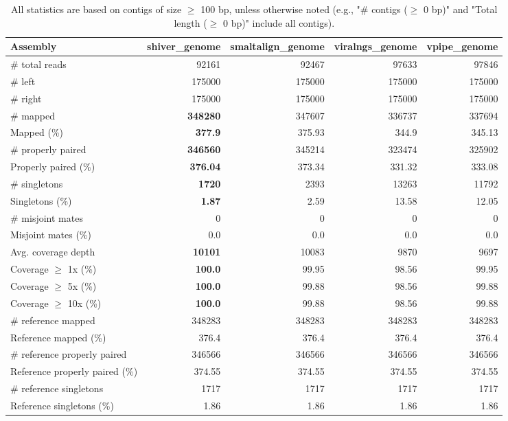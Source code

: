 \documentclass[12pt,a4paper]{article}
\begin{document}
\begin{table}[ht]
\begin{center}
\caption{All statistics are based on contigs of size $\geq$ 100 bp, unless otherwise noted (e.g., "\# contigs ($\geq$ 0 bp)" and "Total length ($\geq$ 0 bp)" include all contigs).}
\begin{tabular}{|l*{4}{|r}|}
\hline
Assembly & shiver\_genome & smaltalign\_genome & viralngs\_genome & vpipe\_genome \\ \hline
\# total reads & 92161 & 92467 & 97633 & 97846 \\ \hline
\# left & 175000 & 175000 & 175000 & 175000 \\ \hline
\# right & 175000 & 175000 & 175000 & 175000 \\ \hline
\# mapped & {\bf 348280} & 347607 & 336737 & 337694 \\ \hline
Mapped (\%) & {\bf 377.9} & 375.93 & 344.9 & 345.13 \\ \hline
\# properly paired & {\bf 346560} & 345214 & 323474 & 325902 \\ \hline
Properly paired (\%) & {\bf 376.04} & 373.34 & 331.32 & 333.08 \\ \hline
\# singletons & {\bf 1720} & 2393 & 13263 & 11792 \\ \hline
Singletons (\%) & {\bf 1.87} & 2.59 & 13.58 & 12.05 \\ \hline
\# misjoint mates & 0 & 0 & 0 & 0 \\ \hline
Misjoint mates (\%) & 0.0 & 0.0 & 0.0 & 0.0 \\ \hline
Avg. coverage depth & {\bf 10101} & 10083 & 9870 & 9697 \\ \hline
Coverage $\geq$ 1x (\%) & {\bf 100.0} & 99.95 & 98.56 & 99.95 \\ \hline
Coverage $\geq$ 5x (\%) & {\bf 100.0} & 99.88 & 98.56 & 99.88 \\ \hline
Coverage $\geq$ 10x (\%) & {\bf 100.0} & 99.88 & 98.56 & 99.88 \\ \hline
\# reference mapped & 348283 & 348283 & 348283 & 348283 \\ \hline
Reference mapped (\%) & 376.4 & 376.4 & 376.4 & 376.4 \\ \hline
\# reference properly paired & 346566 & 346566 & 346566 & 346566 \\ \hline
Reference properly paired (\%) & 374.55 & 374.55 & 374.55 & 374.55 \\ \hline
\# reference singletons & 1717 & 1717 & 1717 & 1717 \\ \hline
Reference singletons (\%) & 1.86 & 1.86 & 1.86 & 1.86 \\ \hline

\end{tabular}
\end{center}
\end{table}
\end{document}
